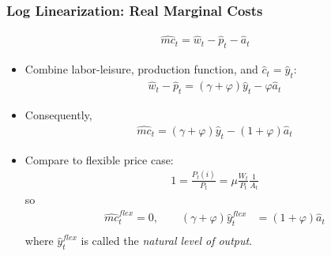 \documentclass[english,xcolor=svgnames]{beamer}
\begin{document}
\begin{frame}
\frametitle{Log Linearization: Real Marginal Costs
}
\begin{align*}
	\hat{mc}_t=\hat{w}_t-\hat{p}_t-\hat{a}_t
\end{align*}
\begin{itemize}
	\item Combine labor-leisure, production function, and $\hat{c}_t=\hat{y}_t$:
	\begin{align*}
		\hat{w}_t-\hat{p}_t=(\gamma+\varphi)\hat{y}_t-\varphi\hat{a}_t
\end{align*}
	\item Consequently,
	\begin{align*}
	\hat{mc}_t=(\gamma+\varphi)\hat{y}_t-(1+\varphi)\hat{a}_t
\end{align*}
\item Compare to flexible price case:
\begin{align*}
	1 = \frac{P_t(i)}{P_t} = \mu\frac{W_t}{P_t}\frac{1}{A_t} 
\end{align*}
so
\begin{align*}
	\hat{mc}_t^{flex} = 0,\qquad (\gamma+\varphi)\hat{y}_t^{flex}&=(1+\varphi)\hat{a}_t \\
\end{align*}
where $\hat{y}_t^{flex}$ is called the \emph{natural level of output}.
\end{itemize}
\end{frame}
\end{document}
